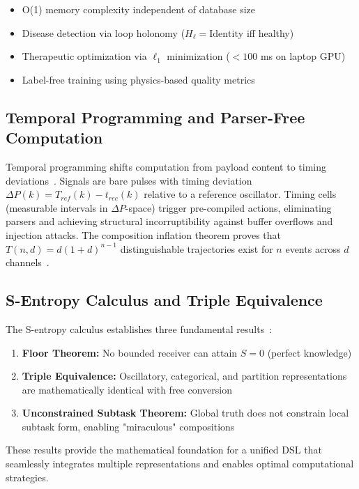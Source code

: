 \documentclass[12pt,a4paper]{article}
\begin{document}
\begin{itemize}
    \item O(1) memory complexity independent of database size
    \item Disease detection via loop holonomy ($H_\ell = \text{Identity}$ iff healthy)
    \item Therapeutic optimization via $\ell_1$ minimization ($<100$ ms on laptop GPU)
    \item Label-free training using physics-based quality metrics
\end{itemize}

\subsection{Temporal Programming and Parser-Free Computation}

Temporal programming shifts computation from payload content to timing deviations~\cite{sachikonye2026temporal}. Signals are bare pulses with timing deviation $\Delta P(k) = T_{ref}(k) - t_{rec}(k)$ relative to a reference oscillator. Timing cells (measurable intervals in $\Delta P$-space) trigger pre-compiled actions, eliminating parsers and achieving structural incorruptibility against buffer overflows and injection attacks. The composition inflation theorem proves that $T(n,d) = d(1+d)^{n-1}$ distinguishable trajectories exist for $n$ events across $d$ channels~\cite{sachikonye2026temporal}.

\subsection{S-Entropy Calculus and Triple Equivalence}

The S-entropy calculus establishes three fundamental results~\cite{sachikonye2026sentropy}:

\begin{enumerate}
    \item \textbf{Floor Theorem:} No bounded receiver can attain $S = 0$ (perfect knowledge)
    \item \textbf{Triple Equivalence:} Oscillatory, categorical, and partition representations are mathematically identical with free conversion
    \item \textbf{Unconstrained Subtask Theorem:} Global truth does not constrain local subtask form, enabling "miraculous" compositions
\end{enumerate}

These results provide the mathematical foundation for a unified DSL that seamlessly integrates multiple representations and enables optimal computational strategies.
\end{document}
